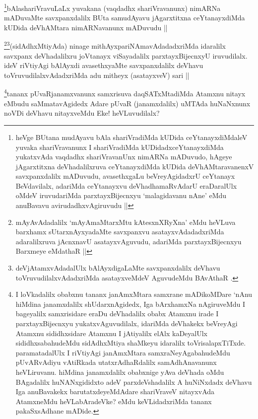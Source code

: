 \begin{artha}
\footnote{heVge BUtana mudAyavu bAla shariVradiMda kUDida ceYtanayxdiMdaleV yuvaka shariVravanunx I shariVradiMda kUDidadxceYtanayxdiMda yukatxvAda vaqdadhx shariVravanUnx nimARNa mADuvudo, hAgeye jAgarxtitxna deVhadalilxruva ceYtanayxdiMda kUDida deVhAMtaravanenxV savxpanxdalilx mADuvudu, avasethxgaLu beVreyAgidadxrU ceYtanayx BeVdavilalx, adariMda ceYtanayxvu deVhadhamaRvAdarU eraDaralUlx oMdeV iruvudariMda parxtayxBijecnxyu `malagidavanu nAne' eMdu anuBavavu avirudadhxvAgiruvudu ||}bAlashariVravuLaLx yuvakana (vaqdadhx shariVravanunx) nimARNa mADuvaMte savxpanxdalilx BUta samudAyavu jAgarxtitxna ceYtanayxdiMda kUDida deVhAMtara nimARNavanunx mADuvudu ||
\end{artha}

\begin{artha}
\footnote{mAyAvAdadalilx `mAyAmaMtarxMtu kAtesxnXRyXna' eMdu heVLuva barxhamx sUtarxnAyxyadaMte savxpanxvu asatayxvAdadadxriMda adaralilxruva jAcnxnavU asatayxvAguvudu, adariMda parxtayxBijecnxyu Barxmeye eMdathaR ||}\footnote{deVjAtamxvAdadalUlx bAlAyxdigaLaMte savxpanxdalilx deVhavu toVruvudilalxvAdadxriMda asatayxveMdeV AguvudeMdu BAvAthaR .}(sidAdhxMtiyAda) ninage mithAyxpariNAmavAdadadxriMda idaralilx savxpanx deVhadalilxru joVtanayx viSayadalilx parxtayxBijecnxyU iruvudilalx. ideV riVtiyAgi bAlAyxdi avasethxyaMte savxpanxdalilx deVhavu toVruvudilalxvAdadxriMda adu mitheyx (asatayxveV) sari || 
\end{artha}

\begin{artha}
\footnote{I loVkadalilx obabxnu tananx janAmxMtara samxrane mADikoMDare `nAnu hiMdina janamxdalilx shUdarxnAgidedx, Iga bArxhamxNa nAgiruveMdu I bageyalilx samxrisidare eraDu deVhadalilx obabx Atamxnu irade I parxtayxBijecnxyu yukatxvAguvudilalx, idariMda deVhakekx beVreyAgi Atamxnu sididhxsidare Atamxnu I jAtiyalilx elAlx kaDeyalUlx sididhxsabahudeMdu sidAdhxMtiya shaMkeyu idaralilx toVrisalapxTiTxde. paramatadalUlx I riVtiyAgi janAmxMtara samxraNeyAgabahudeMdu pUvARvAdiyu vAtiRkada utatxrAdhaRdalilx samAdhAnavanunx heVLiruvanu. hiMdina janamxdalilx obabxnige yAva deVhada oMdu BAgadalilx huNANxgididxto adeV parxdeVshadalilx A huNiNxdadx deVhavu Iga anuBavakekx barutatxdeyeMdAdare shariVraveV nitayxvAda AtamxneMdu heVLabAradeVke? eMdu keVLidadxriMda tananx pakaSxsAdhane mADide.}tananx pUvaRjanamxvanunx samxrisuva daqSATxMtadiMda Atamxnu nitayx eMbudu saMmatavAgidedx Adare pUvaR (janamxdalilx) uMTAda huNaNxnunx noVDi deVhavu nitayxveMdu Eke! heVLuvudilalx? 
\end{artha}

